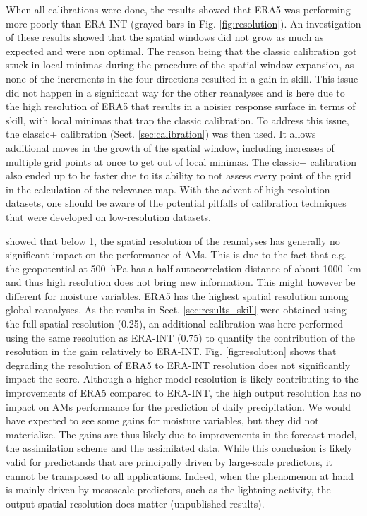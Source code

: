 \documentclass[alpha-refs]{wiley-article}
\begin{document}
When all calibrations were done, the results showed that ERA5 was performing more poorly than ERA-INT (grayed bars in Fig. \ref{fig:resolution}). An investigation of these results showed that the spatial windows did not grow as much as expected and were non optimal. The reason being that the classic calibration got stuck in local minimas during the procedure of the spatial window expansion, as none of the increments in the four directions resulted in a gain in skill. This issue did not happen in a significant way for the other reanalyses and is here due to the high resolution of ERA5 that results in a noisier response surface in terms of skill, with local minimas that trap the classic calibration. To address this issue, the classic+ calibration (Sect. \ref{sec:calibration}) was then used. It allows additional moves in the growth of the spatial window, including increases of multiple grid points at once to get out of local minimas. The classic+ calibration also ended up to be faster due to its ability to not assess every point of the grid in the calculation of the relevance map. With the advent of high resolution datasets, one should be aware of the potential pitfalls of calibration techniques that were developed on low-resolution datasets.

\citet{Horton2018b} showed that below 1\degree, the spatial resolution of the reanalyses has generally no significant impact on the performance of AMs. This is due to the fact that e.g. the geopotential at 500~hPa has a half-autocorrelation distance of about 1000~km \cite{Thiebaux1985} and thus high resolution does not bring new information. This might however be different for moisture variables. ERA5 has the highest spatial resolution among global reanalyses. As the results in Sect. \ref{sec:results_skill} were obtained using the full spatial resolution (0.25\degree), an additional calibration was here performed using the same resolution as ERA-INT (0.75\degree) to quantify the contribution of the resolution in the gain relatively to ERA-INT. Fig. \ref{fig:resolution} shows that degrading the resolution of ERA5 to ERA-INT resolution does not significantly impact the score. Although a higher model resolution is likely contributing to the improvements of ERA5 compared to ERA-INT, the high output resolution has no impact on AMs performance for the prediction of daily precipitation. We would have expected to see some gains for moisture variables, but they did not materialize. The gains are thus likely due to improvements in the forecast model, the assimilation scheme and the assimilated data. While this conclusion is likely valid for predictands that are principally driven by large-scale predictors, it cannot be transposed to all applications. Indeed, when the phenomenon at hand is mainly driven by mesoscale predictors, such as the lightning activity, the output spatial resolution does matter (unpublished results).
\end{document}
